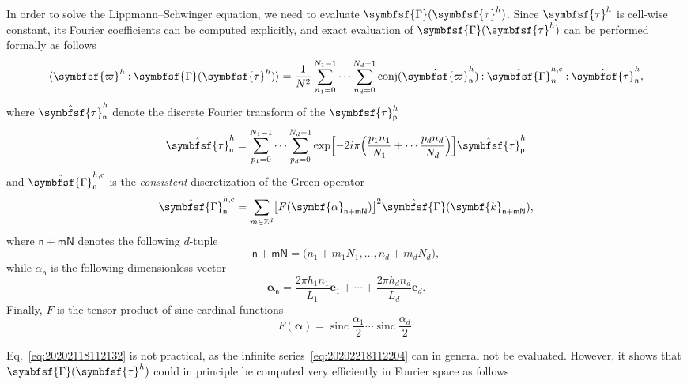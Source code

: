 \documentclass[draft, appendixprefix=true, chapterprefix=true, fontsize=12pt, numbers=noendperiod]{scrbook}
\DeclareMathOperator{\conj}{conj}
\newcommand{\dbldot}{\mathbin{\mathord{:}}}
\newcommand{\integers}{\mathbb{Z}}
\newcommand{\tens}[1]{\symbfsf{#1}}
\renewcommand{\vec}[1]{\symbf{#1}}
\DeclareMathOperator{\sinc}{sinc}
\newcommand{\tuple}[1]{\mathsf{#1}}
\begin{document}
In order to solve the Lippmann--Schwinger equation, we
need to evaluate \(\tens\Gamma(\tens\tau^h)\). Since \(\tens\tau^h\) is
cell-wise constant, its Fourier coefficients can be computed explicitly, and
exact evaluation of \(\tens\Gamma(\tens\tau^h)\) can be performed formally
\parencite{bris2010a,bris2012a} as follows
\begin{equation}
  \label{eq:20202118112132}
  \langle\tens\varpi^h\dbldot\tens\Gamma(\tens\tau^h)\rangle=\frac1{N^2}
  \sum_{n_1=0}^{N_1-1}\cdots\sum_{n_d=0}^{N_d-1}\conj(\hat{\tens\varpi}_
  {\tuple{n}}^h)\dbldot\hat{\tens\Gamma}_n^{h, \mathrm{c}}\dbldot
  \hat{\tens\tau}_{\tuple{n}}^h,
\end{equation}
where \(\hat{\tens\tau}_{\tuple{n}}^h\) denote the discrete Fourier transform
of the \(\tens\tau_{\tuple{p}}^h\)
\begin{equation}
  \hat{\tens\tau}_{\tuple{n}}^h=\sum_{p_1=0}^{N_1-1}\cdots\sum_{p_d=0}^{N_d-1}\exp\Bigl[
  -2i\pi\Bigl(\frac{p_1n_1}{N_1}+\cdots\frac{p_dn_d}{N_d}\Bigr)\Bigr]
  \hat{\tens\tau}_{\tuple{p}}^h
\end{equation}
and \(\hat{\tens\Gamma}_{\tuple{n}}^{h, \mathrm{c}}\) is the \emph{consistent}
discretization of the Green operator
\begin{equation}
  \label{eq:20202218112204}
  \hat{\tens\Gamma}_{\tuple{n}}^{h, \mathrm{c}}=\sum_{m\in\integers^d}\bigl[F(\vec
  \alpha_{\tuple{n+mN}})\bigr]^2\hat{\tens\Gamma}(\vec k_{\tuple{n+mN}}),
\end{equation}
where \(\tuple{n+mN}\) denotes the following \(d\)-tuple
\begin{equation}
  \tuple{n+mN}=\bigl(n_1+m_1N_1, \ldots, n_d+m_dN_d\bigr),
\end{equation}
while \(\alpha_{\tuple{n}}\) is the following dimensionless vector
\begin{equation}
  \vec\alpha_{\tuple{n}}=\frac{2\pi h_1n_1}{L_1}\vec e_1+\cdots+\frac{2\pi h_dn_d}{L_d}\vec e_d.
\end{equation}
Finally, \(F\) is the tensor product of sine cardinal functions
\begin{equation}
  F(\vec\alpha)=\sinc\frac{\alpha_1}2\cdots\sinc\frac{\alpha_d}2.
\end{equation}

Eq.~\eqref{eq:20202118112132} is not practical, as the infinite
series~\eqref{eq:20202218112204} can in general not be evaluated. However, it
shows that \(\tens\Gamma(\tens\tau^h)\) could in principle be computed very
efficiently in Fourier space as follows
\end{document}
